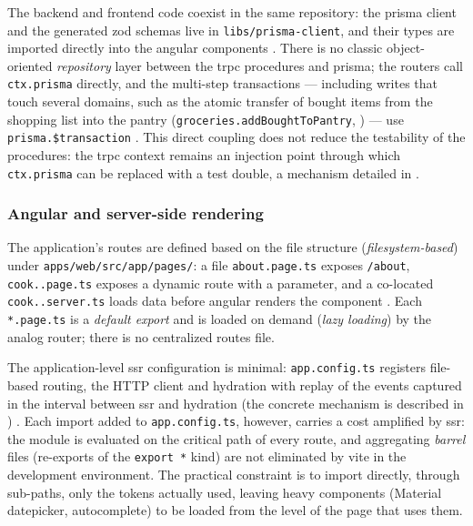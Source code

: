 The backend and frontend code coexist in the same repository: the \gls{prisma} client and the generated \gls{zod} schemas live in \texttt{libs/prisma-client}, and their types are imported directly into the \gls{angular} components \cite{prisma_zod_generator}. There is no classic object-oriented \textit{repository} layer between the \gls{trpc} procedures and \gls{prisma}; the routers call \texttt{ctx.prisma} directly, and the multi-step transactions --- including writes that touch several domains, such as the atomic transfer of bought items from the shopping list into the pantry (\texttt{groceries.addBoughtToPantry}, ) --- use \texttt{prisma.\$transaction} \cite{trpc,prisma_transactions}. This direct coupling does not reduce the testability of the procedures: the \gls{trpc} context remains an injection point through which \texttt{ctx.prisma} can be replaced with a test double, a mechanism detailed in .

\subsubsection{Angular and server-side rendering}\label{subsec:angular-ssr-implementare}

The application's routes are defined based on the file structure (\textit{filesystem-based}) under \texttt{apps/\allowbreak web/\allowbreak src/\allowbreak app/\allowbreak pages/}: a file \texttt{about.page.ts} exposes \texttt{/about}, \texttt{cook.\allowbreak [recipeId].\allowbreak page.ts} exposes a dynamic route with a parameter, and a co-located \texttt{cook.\allowbreak [recipeId].\allowbreak server.ts} loads data before \gls{angular} renders the component \cite{analog,analog_routing}. Each \texttt{*.page.ts} is a \textit{default export} and is loaded on demand (\textit{lazy loading}) by the \gls{analog} router; there is no centralized routes file.

The application-level \acrshort{ssr} configuration is minimal: \texttt{app.config.ts} registers file-based routing, the HTTP client and hydration with replay of the events captured in the interval between \acrshort{ssr} and \gls{hydration} (the concrete mechanism is described in ) \cite{analog}. Each import added to \texttt{app.config.ts}, however, carries a cost amplified by \acrshort{ssr}: the module is evaluated on the critical path of every route, and aggregating \textit{barrel} files (re-exports of the \texttt{export *} kind) are not eliminated by \gls{vite} in the development environment. The practical constraint is to import directly, through sub-paths, only the tokens actually used, leaving heavy components (Material datepicker, autocomplete) to be loaded from the level of the page that uses them.

